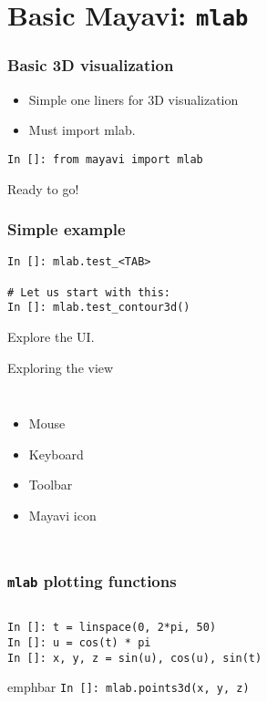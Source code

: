 \documentclass[14pt,compress]{beamer}
\newcommand{\emphbar}[1]
{\begin{beamercolorbox}[rounded=true]{emphbar}
      {#1}
 \end{beamercolorbox}
}
\newcommand{\myemph}[1]{\structure{\emph{#1}}}
\newcommand{\PythonCode}[1]{\lstinline{#1}}
\newcommand{\typ}[1]{\lstinline{#1}}
\begin{document}
\section{Basic Mayavi: \typ{mlab}}

\begin{frame}[fragile]
\frametitle{Basic 3D visualization}
\begin{itemize}
    \item Simple one liners for 3D visualization
    \item Must import mlab.
\end{itemize}
\begin{lstlisting}
In []: from mayavi import mlab
\end{lstlisting}
Ready to go!
\end{frame}

\begin{frame}[fragile]
    \frametitle{Simple example}

    \begin{lstlisting}
In []: mlab.test_<TAB>

# Let us start with this:
In []: mlab.test_contour3d()
\end{lstlisting}
Explore the UI.
\end{frame}

\begin{frame}
    {Exploring the view}
    \begin{columns}
        \begin{itemize}
            \item Mouse
            \item Keyboard
            \item Toolbar
            \item Mayavi icon
        \end{itemize}
    \end{columns}
\end{frame}

\begin{frame}[fragile]
    \frametitle{\typ{mlab} plotting functions}
    \begin{columns}
        \myemph{\Large 0D data}
    \end{columns}

    \begin{lstlisting}
In []: t = linspace(0, 2*pi, 50)
In []: u = cos(t) * pi
In []: x, y, z = sin(u), cos(u), sin(t)
    \end{lstlisting}
    \emphbar{\PythonCode{In []: mlab.points3d(x, y, z)}}
\end{frame}
\end{document}
